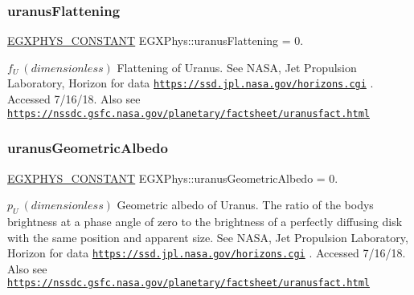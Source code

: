 \subsubsection{\texorpdfstring{uranus\+Flattening}{uranusFlattening}}
{\footnotesize\ttfamily \mbox{\hyperlink{group___e_g_x_phys-_constants-_macros_ga76980d288494ce1714c9ac68a95ba702}{E\+G\+X\+P\+H\+Y\+S\+\_\+\+C\+O\+N\+S\+T\+A\+NT}} E\+G\+X\+Phys\+::uranus\+Flattening = 0.}

$f_{U} \ (dimensionless)$ Flattening of Uranus. See N\+A\+SA, Jet Propulsion Laboratory, Horizon for data \href{https://ssd.jpl.nasa.gov/horizons.cgi}{\tt https\+://ssd.\+jpl.\+nasa.\+gov/horizons.\+cgi} . Accessed 7/16/18. Also see \href{https://nssdc.gsfc.nasa.gov/planetary/factsheet/uranusfact.html}{\tt https\+://nssdc.\+gsfc.\+nasa.\+gov/planetary/factsheet/uranusfact.\+html} \mbox{\label{group___e_g_x_phys-_constants-_astrophysics-_solar_system-_uranus-_bulk_ga9a1cfdab26c38a850508aa9b1e2409a1}} 
\subsubsection{\texorpdfstring{uranus\+Geometric\+Albedo}{uranusGeometricAlbedo}}
{\footnotesize\ttfamily \mbox{\hyperlink{group___e_g_x_phys-_constants-_macros_ga76980d288494ce1714c9ac68a95ba702}{E\+G\+X\+P\+H\+Y\+S\+\_\+\+C\+O\+N\+S\+T\+A\+NT}} E\+G\+X\+Phys\+::uranus\+Geometric\+Albedo = 0.}

$ p_{U} \ (dimensionless)$ Geometric albedo of Uranus. The ratio of the body\textquotesingle{}s brightness at a phase angle of zero to the brightness of a perfectly diffusing disk with the same position and apparent size. See N\+A\+SA, Jet Propulsion Laboratory, Horizon for data \href{https://ssd.jpl.nasa.gov/horizons.cgi}{\tt https\+://ssd.\+jpl.\+nasa.\+gov/horizons.\+cgi} . Accessed 7/16/18. Also see \href{https://nssdc.gsfc.nasa.gov/planetary/factsheet/uranusfact.html}{\tt https\+://nssdc.\+gsfc.\+nasa.\+gov/planetary/factsheet/uranusfact.\+html} \mbox{\label{group___e_g_x_phys-_constants-_astrophysics-_solar_system-_uranus-_bulk_ga2b1d23bfe148337be5275b1abd51f97a}} 
